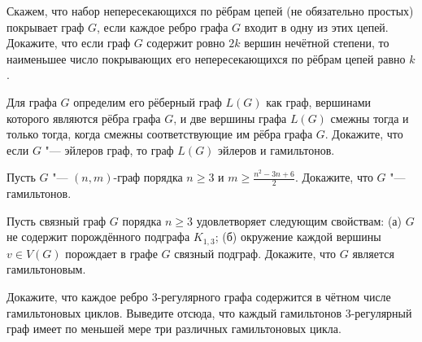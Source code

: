 \documentclass[12pt, a4paper]{article}
\begin{document}
\begin{problemList}
\bigskip

{Скажем, что набор непересекающихся по рёбрам цепей (не обязательно простых) покрывает граф $G$,
если каждое ребро графа $G$ входит в одну из этих цепей.
Докажите, что если граф $G$ содержит ровно $2k$ вершин нечётной степени,
то наименьшее число покрывающих его непересекающихся по рёбрам цепей равно $k$.}

\bigskip

{Для графа $G$ определим его рёберный граф $L(G)$ как граф,
вершинами которого являются рёбра графа $G$, и две вершины графа $L(G)$ смежны
тогда и только тогда, когда смежны соответствующие им рёбра графа $G$.
Докажите, что если $G$ "--- эйлеров граф, то граф $L(G)$ эйлеров и гамильтонов.}

\bigskip

{Пусть $G$ "--- $(n, m)$-граф порядка $n \ge 3$ и $m \ge \frac{n^2 - 3n + 6}{2}$.
Докажите, что $G$ "--- гамильтонов.}

\bigskip

{Пусть связный граф $G$ порядка $n \ge 3$ удовлетворяет следующим свойствам:
(а) $G$ не содержит порождённого подграфа $K_{1, 3}$;
(б) окружение каждой вершины $v \in V(G)$ порождает в графе $G$ связный подграф.
Докажите, что $G$ является гамильтоновым.}

\bigskip

{Докажите, что каждое ребро 3-регулярного графа содержится в чётном числе гамильтоновых циклов.
Выведите отсюда, что каждый гамильтонов 3-регулярный граф имеет по меньшей мере три различных гамильтоновых цикла.}

\end{problemList}
\end{document}
